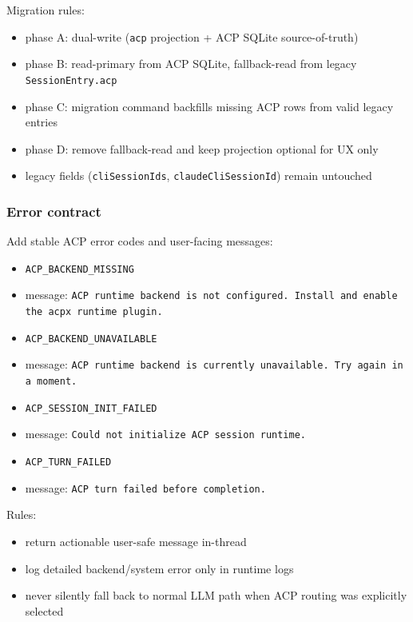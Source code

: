 Migration rules:

\begin{itemize}
  \item phase A: dual-write (\texttt{acp} projection + ACP SQLite source-of-truth)
  \item phase B: read-primary from ACP SQLite, fallback-read from legacy \texttt{SessionEntry.acp}
  \item phase C: migration command backfills missing ACP rows from valid legacy entries
  \item phase D: remove fallback-read and keep projection optional for UX only
  \item legacy fields (\texttt{cliSessionIds}, \texttt{claudeCliSessionId}) remain untouched
\end{itemize}


\subsubsection{Error contract}


Add stable ACP error codes and user-facing messages:

\begin{itemize}
  \item \texttt{ACP\_BACKEND\_MISSING}
  \item message: \texttt{ACP runtime backend is not configured. Install and enable the acpx runtime plugin.}
  \item \texttt{ACP\_BACKEND\_UNAVAILABLE}
  \item message: \texttt{ACP runtime backend is currently unavailable. Try again in a moment.}
  \item \texttt{ACP\_SESSION\_INIT\_FAILED}
  \item message: \texttt{Could not initialize ACP session runtime.}
  \item \texttt{ACP\_TURN\_FAILED}
  \item message: \texttt{ACP turn failed before completion.}
\end{itemize}


Rules:

\begin{itemize}
  \item return actionable user-safe message in-thread
  \item log detailed backend/system error only in runtime logs
  \item never silently fall back to normal LLM path when ACP routing was explicitly selected
\end{itemize}


